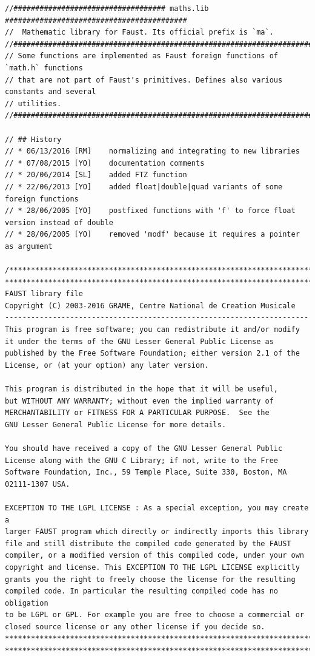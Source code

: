 \documentclass{article}
\begin{document}
\bigskip\bigskip
\begin{lstlisting}[caption=\texttt{maths.lib}]
//################################### maths.lib ##########################################
//  Mathematic library for Faust. Its official prefix is `ma`.
//########################################################################################
// Some functions are implemented as Faust foreign functions of `math.h` functions
// that are not part of Faust's primitives. Defines also various constants and several
// utilities.
//########################################################################################

// ## History
// * 06/13/2016 [RM]	normalizing and integrating to new libraries
// * 07/08/2015	[YO]	documentation comments
// * 20/06/2014	[SL]	added FTZ function
// * 22/06/2013	[YO]	added float|double|quad variants of some foreign functions
// * 28/06/2005	[YO]	postfixed functions with 'f' to force float version instead of double
// * 28/06/2005	[YO]	removed 'modf' because it requires a pointer as argument

/************************************************************************
************************************************************************
FAUST library file
Copyright (C) 2003-2016 GRAME, Centre National de Creation Musicale
----------------------------------------------------------------------
This program is free software; you can redistribute it and/or modify
it under the terms of the GNU Lesser General Public License as
published by the Free Software Foundation; either version 2.1 of the
License, or (at your option) any later version.

This program is distributed in the hope that it will be useful,
but WITHOUT ANY WARRANTY; without even the implied warranty of
MERCHANTABILITY or FITNESS FOR A PARTICULAR PURPOSE.  See the
GNU Lesser General Public License for more details.

You should have received a copy of the GNU Lesser General Public
License along with the GNU C Library; if not, write to the Free
Software Foundation, Inc., 59 Temple Place, Suite 330, Boston, MA
02111-1307 USA.

EXCEPTION TO THE LGPL LICENSE : As a special exception, you may create a
larger FAUST program which directly or indirectly imports this library
file and still distribute the compiled code generated by the FAUST
compiler, or a modified version of this compiled code, under your own
copyright and license. This EXCEPTION TO THE LGPL LICENSE explicitly
grants you the right to freely choose the license for the resulting
compiled code. In particular the resulting compiled code has no obligation
to be LGPL or GPL. For example you are free to choose a commercial or
closed source license or any other license if you decide so.
************************************************************************
************************************************************************/


\end{lstlisting}
\end{document}
